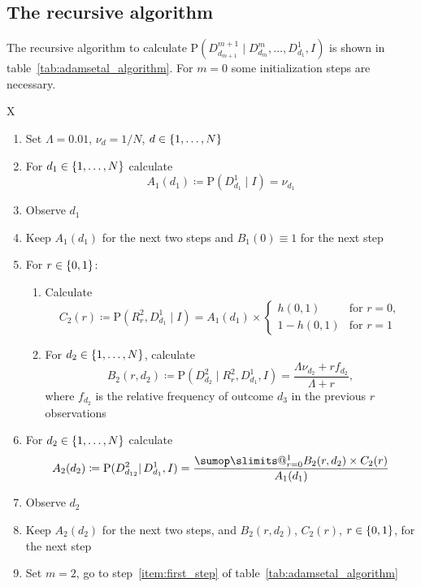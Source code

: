 \documentclass[\ifafour a4paper,12pt,\else a5paper,10pt,\fi%
onecolumn,oneside,article,%
british%
]{memoir}
\makeatletter
\theoremstyle{remark}
\theoremstyle{innote}
\def\sum{\DOTSI\sumop\slimits@}
\newcommand*{\defd}{\coloneqq}
\DeclarePairedDelimiter\set{\{}{\}}
\newcommand*{\p}{\mathrm{P}}%
\renewcommand*{\|}{\mathpunct{|}}
\newcommand*{\yff}{f}
\newcommand*{\yN}{\varLambda}
\newcommand*{\ynn}{\nu}
\newcommand*{\yI}{I}
\newcommand*{\yrs}{h}
\makeatother
\begin{document}
\subsection{The recursive algorithm}
\label{sec:adamsetal_algorithm}

The recursive algorithm to calculate
$\p(D^{m+1}_{d_{m+1}} \| D^{m}_{d_{m}}, \dotsc, D^{1}_{d_{1}}, \yI)$ is
shown in table~\ref{tab:adamsetal_algorithm}. For $m=0$ some initialization
steps are necessary.
\begin{table}[!b]
  \centering
  \caption{Initial steps of predictive algorithm}
  \label{tab:adamsetal_initial}
  \begin{tabularx}{\textwidth}{X}\hline
    \begin{enumerate}%
    \item Set $\yN=0.01$, $\ynn_d=1/N$, $d\in\set{1,\dotsc,N}$
    \item For $d_1 \in \set{1,\dotsc,N}$ calculate
      \[A_1(d_1)\defd \p(D^{1}_{d_{1}} \|  \yI) =\ynn_{d_1} \]
    \item Observe $d_1$
    \item Keep  $A_1(d_1)$ for the next two steps and $B_1(0)\equiv 1$ for
      the next step

      \bigskip
    \item For $r \in\set{0,1}$:
      \begin{enumerate}[label*=\arabic*.]
   \item Calculate
      \[
        C_2(r) \defd \p(R^{2}_{r}, D^{1}_{d_1} \| \yI)
        =
A_1(d_1) \times \begin{cases}
          \yrs(0,1) &\text{for $r=0$},\\ 1-\yrs(0,1)&\text{for $r=1$}
        \end{cases}
      \]
      \item For $d_{2} \in \set{1,\dotsc,N}$, calculate
        \[ 
          B_{2}(r,d_{2}) \defd
          \p(D^{2}_{d_{2}} \| R^{2}_{r}, D^{1}_{d_{1}}, \yI) =
         \frac{\yN\ynn_{d_{2}}+r\yff_{d_{2}}}{\yN + r},
        \]
     where $\yff_{d_{2}}$ is the relative frequency of outcome $d_{3}$ in
     the previous $r$ observations
    \end{enumerate}
  \item  For $d_2 \in \set{1,\dotsc,N}$ calculate
      \[A_2(d_2) \defd
        \p(D^{2}_{d_{12}} \| D^{1}_{d_{1}}, \yI) =
\frac{\sum_{r=0}^{1} B_{2}(r,d_{2}) \times C_{2}(r)}{A_{1}(d_{1})} \]
\item Observe $d_2$
\item Keep $A_{2}(d_{2})$ for the next two steps, and
  $B_{2}(r,d_{2})$, $C_{2}(r)$, $r\in\set{0,1}$, for the next step
\item Set $m=2$, go to step~\ref{item:first_step} of table~\ref{tab:adamsetal_algorithm}
\end{enumerate}
\\\hline
  \end{tabularx}
\end{table}
\end{document}
